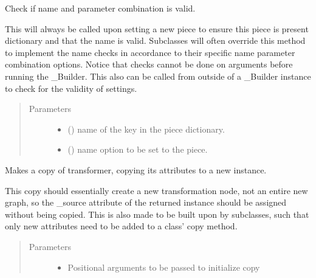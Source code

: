 \documentclass[letterpaper,10pt,english]{sphinxmanual}
\begin{document}
\begin{fulllineitems}
\begin{fulllineitems}
\label{\detokenize{dalio.pipe:dalio.pipe.CovShrink.check_name}}
Check if name and parameter combination is valid.

This will always be called upon setting a new piece to ensure this
piece is present dictionary and that the name is valid. Subclasses
will often override this method to implement the name checks in
accordance to their specific name parameter combination options.
Notice that checks cannot be done on arguments before running the
\_Builder. This also can be called from outside of a \_Builder instance
to check for the validity of settings.
\begin{quote}\begin{description}
\item[{Parameters}] \leavevmode\begin{itemize}
\item {} 
 () \textendash{} name of the key in the piece dictionary.

\item {} 
 () \textendash{} name option to be set to the piece.

\end{itemize}

\end{description}\end{quote}

\end{fulllineitems}


\begin{fulllineitems}
\label{\detokenize{dalio.pipe:dalio.pipe.CovShrink.copy}}
Makes a copy of transformer, copying its attributes to a new
instance.

This copy should essentially create a new transformation node, not an
entire new graph, so the \_source attribute of the returned instance
should be assigned without being copied. This is also made to be built
upon by subclasses, such that only new attributes need to be added to
a class’ copy method.
\begin{quote}\begin{description}
\item[{Parameters}] \leavevmode\begin{itemize}
\item {} 
 \textendash{} Positional arguments to be passed to initialize copy


\end{itemize}
\end{description}
\end{quote}
\end{fulllineitems}
\end{fulllineitems}
\end{document}
